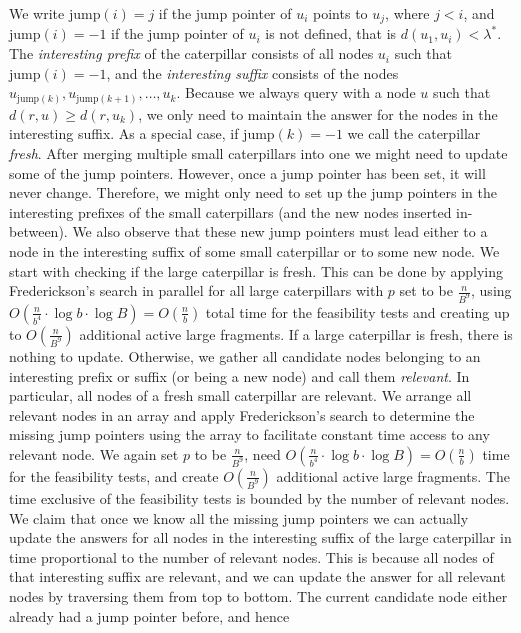 \documentclass[11pt,a4paper]{article}
\newcommand{\jump}{\text{jump}}
\theoremstyle{definition}
\theoremstyle{remark}
\begin{document}
We write $\jump(i)=j$ if the jump pointer of $u_{i}$ points to $u_{j}$, where $j<i$, and $\jump(i)=-1$
if the jump pointer of $u_{i}$ is not defined, that is $d(u_{1},u_{i})<\lambda^{*}$.
The {\em interesting prefix} of the caterpillar consists of all nodes $u_{i}$ such that $\jump(i)=-1$,
and the {\em interesting suffix} consists of the nodes $u_{\jump(k)},u_{\jump(k+1)},\ldots,u_{k}$.
Because we always query with a node $u$ such that $d(r,u) \geq d(r,u_{k})$, we only
need to maintain the answer for the nodes in the interesting suffix. As a special case,
if $\jump(k)=-1$ we call the caterpillar \emph{fresh}.
After merging multiple small caterpillars into one we might need to update some of the jump pointers.
However, once a jump pointer has been set, it will never change. Therefore, we might only
need to set up the jump pointers in the interesting prefixes of the small caterpillars
(and the new nodes inserted in-between). We also observe that these new jump pointers
must lead either to a node in the interesting suffix of some small caterpillar
or to some new node. We start with checking if the large caterpillar is fresh. This can be
done by applying Frederickson's search in parallel for all large caterpillars with $p$ set to
be $\frac{n}{B^{9}}$, using $O(\frac{n}{b^{4}}\cdot \log b \cdot \log B)=O(\frac{n}{b})$
total time for the feasibility tests and creating up to $O(\frac{n}{B^{9}})$ additional active large
fragments. If a large caterpillar is fresh, there is nothing to update. Otherwise,
we gather all candidate nodes belonging to
an interesting prefix or suffix (or being a new node) and call them \emph{relevant}. In particular,
all nodes of a fresh small caterpillar are relevant.
We arrange all relevant nodes in an array and apply Frederickson's search to determine the missing jump
pointers using the array to facilitate constant time access to any relevant node. We again
set $p$ to be $\frac{n}{B^{9}}$, need $O(\frac{n}{b^{4}}\cdot \log b \cdot \log B)=O(\frac{n}{b})$
time for the feasibility tests, and create $O(\frac{n}{B^{9}})$ additional active large fragments.
The time exclusive of the feasibility tests is bounded by the number of relevant nodes.
We claim that once we know all the missing jump pointers we can actually update the answers
for all nodes in the interesting suffix of the large caterpillar in time proportional to the
number of relevant nodes. This is because all nodes of that interesting suffix are
relevant, and we can update the answer for all relevant nodes by traversing them from top
to bottom. The current candidate node either already had a jump pointer before, and hence
\end{document}
